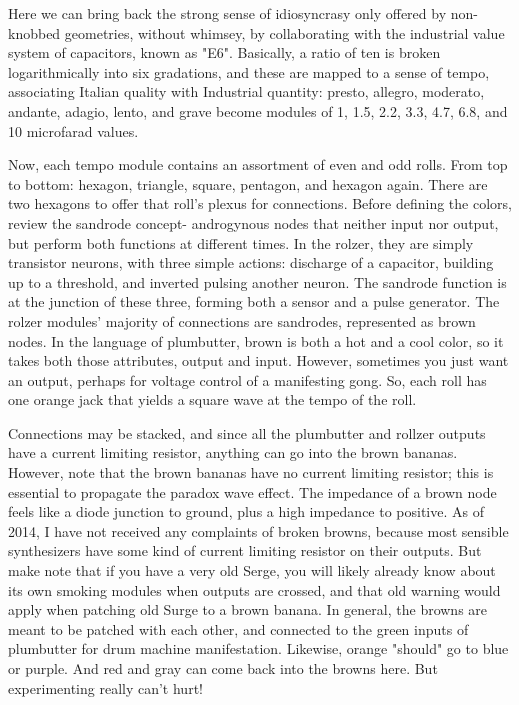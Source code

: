 Here we can bring back the strong sense of idiosyncrasy only offered by non-knobbed geometries, without whimsey, by collaborating with the industrial value system of capacitors, known as "E6". Basically, a ratio of ten is broken logarithmically into six gradations, and these are mapped to a sense of tempo, associating Italian quality with Industrial quantity: presto, allegro, moderato, andante, adagio, lento, and grave become modules of 1, 1.5, 2.2, 3.3, 4.7, 6.8, and 10 microfarad values.

Now, each tempo module contains an assortment of even and odd rolls. From top to bottom: hexagon, triangle, square, pentagon, and hexagon again. There are two hexagons to offer that roll's plexus for connections. Before defining the colors, review the sandrode concept- androgynous nodes that neither input nor output, but perform both functions at different times. In the rolzer, they are simply transistor neurons, with three simple actions: discharge of a capacitor, building up to a threshold, and inverted pulsing another neuron. The sandrode function is at the junction of these three, forming both a sensor and a pulse generator. The rolzer modules' majority of connections are sandrodes, represented as brown nodes. In the language of plumbutter, brown is both a hot and a cool color, so it takes both those attributes, output and input. However, sometimes you just want an output, perhaps for voltage control of a manifesting gong. So, each roll has one orange jack that yields a square wave at the tempo of the roll.

Connections may be stacked, and since all the plumbutter and rollzer outputs have a current limiting resistor, anything can go into the brown bananas. However, note that the brown bananas have no current limiting resistor; this is essential to propagate the paradox wave effect. The impedance of a brown node feels like a diode junction to ground, plus a high impedance to positive. As of 2014, I have not received any complaints of broken browns, because most sensible synthesizers have some kind of current limiting resistor on their outputs. But make note that if you have a very old Serge, you will likely already know about its own smoking modules when outputs are crossed, and that old warning would apply when patching old Surge to a brown banana. In general, the browns are meant to be patched with each other, and connected to the green inputs of plumbutter for drum machine manifestation. Likewise, orange "should" go to blue or purple. And red and gray can come back into the browns here. But experimenting really can't hurt!

